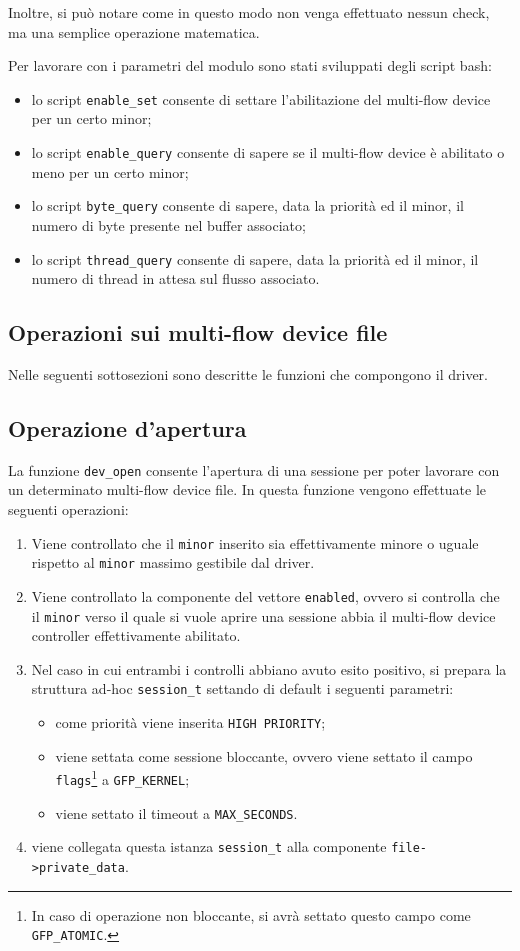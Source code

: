 \documentclass[oneside]{article}
\begin{document}
Inoltre, si può notare come in questo modo non venga effettuato nessun check, ma una semplice operazione matematica.

Per lavorare con i parametri del modulo sono stati sviluppati degli script bash:
\begin{itemize}
\item lo script \texttt{enable\_set} consente di settare l'abilitazione del multi-flow device per un certo minor;
\item lo script \texttt{enable\_query} consente di sapere se il multi-flow device è abilitato o meno per un certo minor;
\item lo script \texttt{byte\_query} consente di sapere, data la priorità ed il minor, il numero di byte presente nel buffer associato;
\item lo script \texttt{thread\_query} consente di sapere, data la priorità ed il minor, il numero di thread in attesa sul flusso associato.
\end{itemize}
\subsection{Operazioni sui multi-flow device file}
Nelle seguenti sottosezioni sono descritte le funzioni che compongono il driver.

\subsection{Operazione d'apertura}
La funzione \texttt{dev\_open} consente l'apertura di una sessione per poter lavorare con un determinato multi-flow device file. In questa funzione vengono effettuate le seguenti operazioni:
\begin{enumerate}
\item Viene controllato che il \texttt{minor} inserito sia effettivamente minore o uguale rispetto al \texttt{minor} massimo gestibile dal driver.
\item Viene controllato la componente del vettore \texttt{enabled}, ovvero si controlla che il \texttt{minor} verso il quale si vuole aprire una sessione abbia il multi-flow device controller effettivamente abilitato.
\item Nel caso in cui entrambi i controlli abbiano avuto esito positivo, si prepara la struttura ad-hoc \texttt{session\_t} settando di default i seguenti parametri:
\begin{itemize}
\item come priorità viene inserita \texttt{HIGH PRIORITY};
\item viene settata come sessione bloccante, ovvero viene settato il campo \texttt{flags}\footnote{In caso di operazione non bloccante, si avrà settato questo campo come \texttt{GFP\_ATOMIC}.} a \texttt{GFP\_KERNEL};
\item viene settato il timeout a \texttt{MAX\_SECONDS}.
\end{itemize}
\item viene collegata questa istanza \texttt{session\_t} alla componente \texttt{file->private\_data}.
\end{enumerate}
\end{document}
